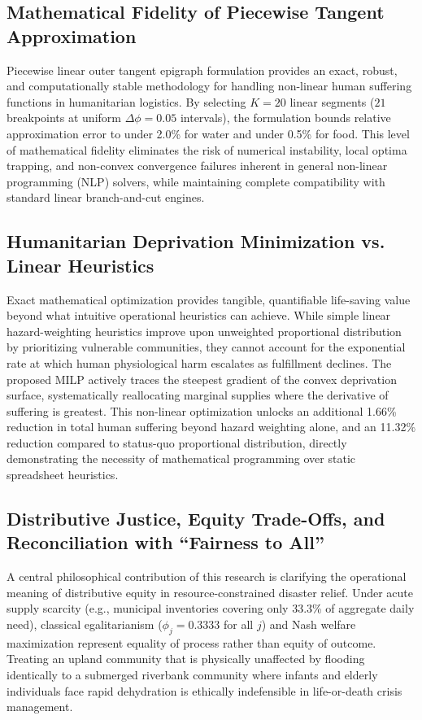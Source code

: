 \subsection{Mathematical Fidelity of Piecewise Tangent Approximation}
Piecewise linear outer tangent epigraph formulation provides an exact, robust, and computationally stable methodology for handling non-linear human suffering functions in humanitarian logistics. By selecting $K = 20$ linear segments ($21$ breakpoints at uniform $\Delta \phi = 0.05$ intervals), the formulation bounds relative approximation error to under 2.0\% for water and under 0.5\% for food. This level of mathematical fidelity eliminates the risk of numerical instability, local optima trapping, and non-convex convergence failures inherent in general non-linear programming (NLP) solvers, while maintaining complete compatibility with standard linear branch-and-cut engines.

\subsection{Humanitarian Deprivation Minimization vs. Linear Heuristics}
Exact mathematical optimization provides tangible, quantifiable life-saving value beyond what intuitive operational heuristics can achieve. While simple linear hazard-weighting heuristics improve upon unweighted proportional distribution by prioritizing vulnerable communities, they cannot account for the exponential rate at which human physiological harm escalates as fulfillment declines. The proposed MILP actively traces the steepest gradient of the convex deprivation surface, systematically reallocating marginal supplies where the derivative of suffering is greatest. This non-linear optimization unlocks an additional 1.66\% reduction in total human suffering beyond hazard weighting alone, and an 11.32\% reduction compared to status-quo proportional distribution, directly demonstrating the necessity of mathematical programming over static spreadsheet heuristics.

\subsection{Distributive Justice, Equity Trade-Offs, and Reconciliation with ``Fairness to All''}
A central philosophical contribution of this research is clarifying the operational meaning of distributive equity in resource-constrained disaster relief. Under acute supply scarcity (e.g., municipal inventories covering only 33.3\% of aggregate daily need), classical egalitarianism ($\phi_j = 0.3333$ for all $j$) and Nash welfare maximization represent equality of process rather than equity of outcome. Treating an upland community that is physically unaffected by flooding identically to a submerged riverbank community where infants and elderly individuals face rapid dehydration is ethically indefensible in life-or-death crisis management.


